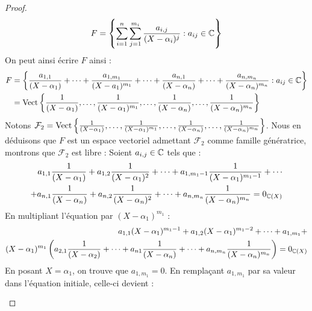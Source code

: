 \begin{proof}
    \[ F = \left\{ \sum_{i = 1}^{n} \sum_{j = 1}^{m_i} \frac{a_{i, j}}{(X - \alpha_i)^{j}} : a_{ij} \in \mathbb{C} \right\} \]
    On peut ainsi écrire $F$ ainsi : 
    \begin{align*}
        F &= \left\{ \frac{a_{1, 1}}{(X - \alpha_1)} + \cdots + \frac{a_{1, m_1}}{(X - a_1)^{m_1}} + \cdots + \frac{a_{n, 1}}{(X - \alpha_n)} + \cdots + \frac{a_{n, m_n}}{(X - \alpha_n)^{m_n}} : a_{ij} \in \mathbb{C} \right\} \\
        &= \operatorname{Vect} \left\{ \frac{1}{(X - \alpha_1)}, \ldots, \frac{1}{(X - \alpha_1)^{m_1}}, \ldots, \frac{1}{(X - \alpha_n)}, \ldots, \frac{1}{(X - \alpha_n)^{m_n}}  \right\}
    \end{align*}
    Notons $\mathcal{F}_2 = \operatorname{Vect} \left\{ \frac{1}{(X - \alpha_1)}, \ldots, \frac{1}{(X - \alpha_1)^{m_1}}, \ldots, \frac{1}{(X - \alpha_n)}, \ldots, \frac{1}{(X - \alpha_n)^{m_n}}  \right\}$. Nous en déduisons que $F$ est un espace vectoriel admettant $\mathcal{F}_2$ comme famille génératrice, montrons que $\mathcal{F}_2$ est libre : Soient $a_{i,j} \in \mathbb{C}$ tels que :
    \begin{align*}
        \begin{split}
            a_{1,1} \frac{1}{(X - \alpha_1)} + a_{1,2} \frac{1}{(X - \alpha_1)^2} + \cdots + a_{1,m_1-1} \frac{1}{(X - \alpha_1)^{m_1 - 1}} + \cdots \\
            + a_{n,1} \frac{1}{(X - \alpha_n)} + a_{n,2} \frac{1}{(X - \alpha_n)^2} + \cdots + a_{n,m_n} \frac{1}{(X - \alpha_n)^{m_n}} = 0_{\mathbb{C}(X)}
        \end{split}
    \end{align*}
    En multipliant l'équation par $(X - \alpha_1)^{m_1}$ :
    \begin{align*}
        \begin{split}
            a_{1,1} (X - \alpha_1)^{m_1 - 1} + a_{1,2} (X - \alpha_1)^{m_1 - 2} + \cdots + a_{1,m_1} + \\
            (X - \alpha_1)^{m_1}
            \left( 
            a_{2,1} \frac{1}{(X - \alpha_2)} + \cdots + a_{n1} \frac{1}{(X - \alpha_n)} + \cdots + a_{n,m_n} \frac{1}{(X - \alpha_n)^{m_n}}
            \right)
            = 0_{\mathbb{C}(X)}
         \end{split}
    \end{align*}
    En posant $X = \alpha_1$, on trouve que $a_{1,m_1} = 0$.
    En remplaçant $a_{1,m_1}$ par sa valeur dans l'équation initiale, celle-ci devient : 
    \begin{align*}
        \begin{split}

\end{split}
\end{align*}
\end{proof}
